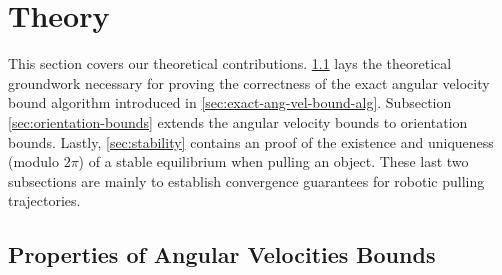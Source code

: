 \documentclass[conference]{IEEEtran}
\newtheorem{proposition}{Proposition}
\newcommand{\EH}[1]{{\color{blue} {Eric: {#1}}  }}
\begin{document}
\section{Theory}\label{sec:methods}

This section covers our theoretical
contributions. \ref{sec:prop-angular-velocity-bounds} lays the
theoretical groundwork necessary for proving the correctness of the
exact angular velocity bound algorithm introduced in
\ref{sec:exact-ang-vel-bound-alg}. Subsection
\ref{sec:orientation-bounds} extends the angular velocity bounds to
orientation bounds. Lastly, \ref{sec:stability} contains an proof of
the existence and uniqueness (modulo $2\pi$) of a stable equilibrium
when pulling an object. These last two subsections are mainly to
establish convergence guarantees for robotic pulling trajectories.

\subsection{Properties of Angular Velocities Bounds}\label{sec:prop-angular-velocity-bounds}


\end{document}
